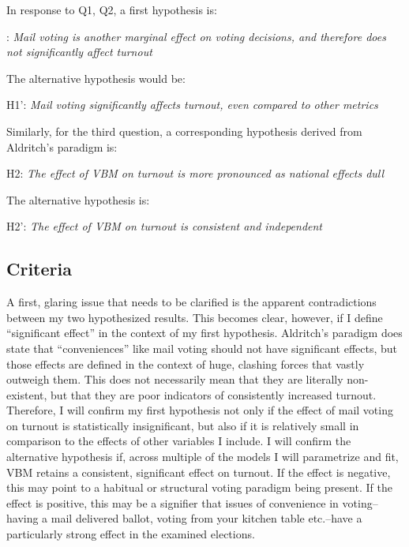 \documentclass[12pt,twoside]{reedthesis}
\begin{document}
  In response to Q1, Q2, a first hypothesis is:
  
  \begin{center}  
  : \textit{Mail voting is another marginal effect on voting decisions, and therefore
  does not significantly affect turnout}
  \end{center}
  
  The alternative hypothesis would be:
  
  \begin{center}  
  H1': \textit{Mail  voting  significantly  affects  turnout,  even  compared  to  other  metrics}
  \end{center}
  
  Similarly, for the third question, a corresponding hypothesis derived
  from Aldritch's paradigm is:
  
  \begin{center}  
  H2: \textit{The  effect  of  VBM  on  turnout  is  more  pronounced  as  national  effects  dull}
  \end{center}
  
  The alternative hypothesis is:
  
  \begin{center}  
  H2': \textit{The  effect  of  VBM  on  turnout  is  consistent  and  independent}
  \end{center}
  
  \subsection{Criteria}\label{criteria}
  
  A first, glaring issue that needs to be clarified is the apparent
  contradictions between my two hypothesized results. This becomes clear,
  however, if I define ``significant effect'' in the context of my first
  hypothesis. Aldritch's paradigm does state that ``conveniences'' like
  mail voting should not have significant effects, but those effects are
  defined in the context of huge, clashing forces that vastly outweigh
  them. This does not necessarily mean that they are literally
  non-existent, but that they are poor indicators of consistently
  increased turnout. Therefore, I will confirm my first hypothesis not
  only if the effect of mail voting on turnout is statistically
  insignificant, but also if it is relatively small in comparison to the
  effects of other variables I include. I will confirm the alternative
  hypothesis if, across multiple of the models I will parametrize and fit,
  VBM retains a consistent, significant effect on turnout. If the effect
  is negative, this may point to a habitual or structural voting paradigm
  being present. If the effect is positive, this may be a signifier that
  issues of convenience in voting--having a mail delivered ballot, voting
  from your kitchen table etc.--have a particularly strong effect in the
  examined elections.
  
\end{document}
